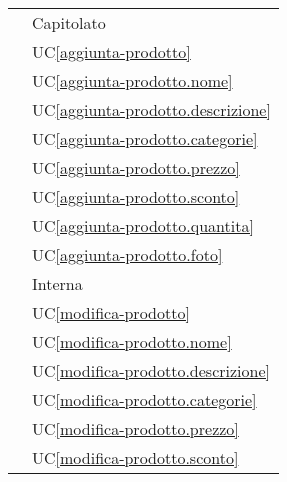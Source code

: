 \begin{longtable}{C{6cm} C{6cm}}
     & Capitolato \\

     & UC\ref{aggiunta-prodotto} \\
        
     & UC\ref{aggiunta-prodotto.nome} \\
        
     & UC\ref{aggiunta-prodotto.descrizione} \\
        
     & UC\ref{aggiunta-prodotto.categorie} \\
        
     & UC\ref{aggiunta-prodotto.prezzo} \\
        
     & UC\ref{aggiunta-prodotto.sconto} \\
        
     & UC\ref{aggiunta-prodotto.quantita} \\
        
     & UC\ref{aggiunta-prodotto.foto} \\
        
     & Interna \\
        
     & UC\ref{modifica-prodotto} \\
        
     & UC\ref{modifica-prodotto.nome} \\
        
     & UC\ref{modifica-prodotto.descrizione} \\
        
     & UC\ref{modifica-prodotto.categorie} \\
        
     & UC\ref{modifica-prodotto.prezzo} \\
        
     & UC\ref{modifica-prodotto.sconto} \\
        

\end{longtable}
